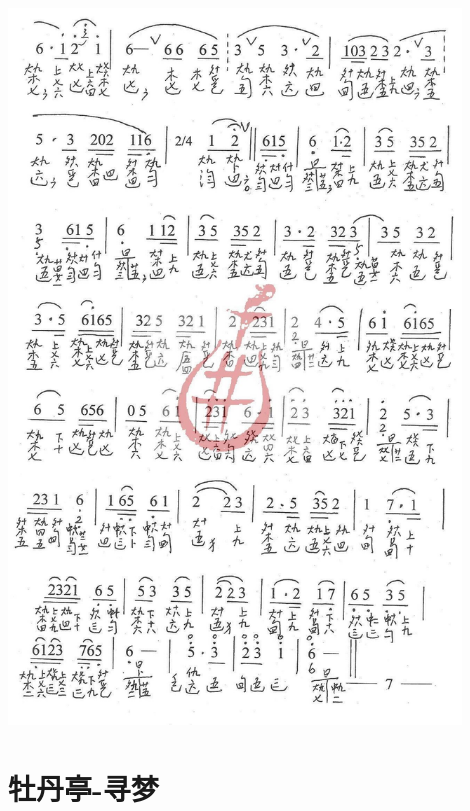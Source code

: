 \documentclass[cn,pad,twocol]{elegantbook}
\begin{document}
\paragraph*{\includegraphics[width=0.9\textwidth]{mudanting/2021-牡丹亭-07惊梦}} 

\section{牡丹亭-寻梦}
\end{document}
